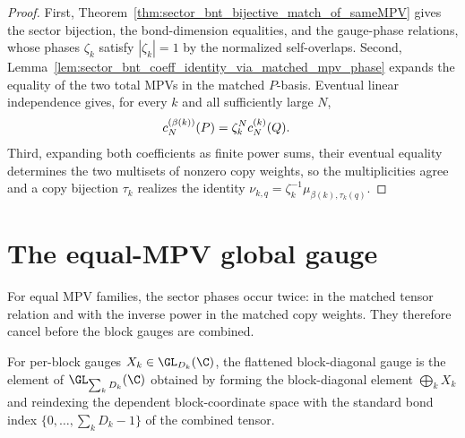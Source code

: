\begin{proof}\leanok
    First, Theorem~\ref{thm:sector_bnt_bijective_match_of_sameMPV} gives the
    sector bijection, the bond-dimension equalities, and the gauge-phase
    relations, whose phases $\zeta_k$ satisfy $|\zeta_k|=1$ by the normalized
    self-overlaps. Second,
    Lemma~\ref{lem:sector_bnt_coeff_identity_via_matched_mpv_phase} expands the
    equality of the two total MPVs in the matched $P$-basis. Eventual linear
    independence gives, for every $k$ and all sufficiently large $N$,
    \begin{align}
        c_N^{(\beta(k))}(P)
         & =\zeta_k^N c_N^{(k)}(Q).
        \notag
    \end{align}
    Third, expanding both coefficients as finite power sums, their eventual
    equality determines the two multisets of nonzero copy weights, so the
    multiplicities agree and a copy bijection $\tau_k$ realizes the identity
    $\nu_{k,q}=\zeta_k^{-1}\mu_{\beta(k),\tau_k(q)}$.
\end{proof}

\section{The equal-MPV global gauge}
\label{sec:ft_equal_global_gauge}

For equal MPV families, the sector phases occur twice: in the matched tensor
relation and with the inverse power in the matched copy weights. They therefore
cancel before the block gauges are combined.

\begin{definition}%
    \label{def:global_gauge_of_blocks}
    \leanok
    For per-block gauges $X_k \in \GL_{D_k}(\C)$, the flattened block-diagonal
    gauge is the element of $\GL_{\sum_k D_k}(\C)$ obtained by forming the
    block-diagonal element $\bigoplus_k X_k$ and reindexing the dependent
    block-coordinate space with the standard bond index
    $\{0,\ldots,\sum_k D_k-1\}$ of the combined tensor.
\end{definition}

